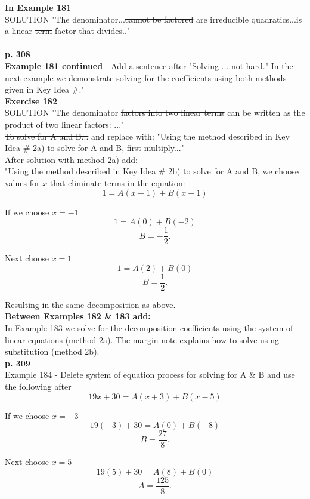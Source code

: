 \documentclass[11pt]{report}
\newlength\tindent
\renewcommand{\indent}{\hspace*{\tindent}}
\begin{document}
\textbf{In Example 181}\\
SOLUTION \indent "The denominator...\sout{cannot be factored} are irreducible quadratics...is a linear \sout{term} factor that divides.."\\ \\

\textbf{p. 308}\\

\textbf{Example 181 continued} - Add a sentence after "Solving ... not hard." In the next example we demonstrate solving for the coefficients using both methods given in Key Idea \#." \\

\textbf{Exercise 182}\\
SOLUTION \indent "The denominator \sout{factors into two linear terms} can be written as the product of two linear factors: ..."\\

\sout{To solve for A and B...} and replace with: "Using the method described in Key Idea \# 2a) to solve for A and B, first multiply..."\\

After solution with method 2a) add:\\
"Using the method described in Key Idea \# 2b) to solve for A and B, we choose values for $x$ that eliminate terms in the equation:
$$1=A(x+1) + B(x-1)$$

If we choose $x=-1$
$$1=A(0) + B(-2)$$
$$B= -\frac{1}{2}.$$ 

Next choose  $x=1$
$$1=A(2) + B(0)$$
$$B= \frac{1}{2}.$$ 

Resulting in the same decomposition as above.\\

\textbf{Between Examples 182 \& 183 add:}\\
In Example 183 we solve for the decomposition coefficients using the system of linear equations (method 2a). The margin note explains how to solve using substitution (method 2b).\\ 

\textbf{p. 309}\\
Example 184 - Delete system of equation process for solving for A \& B and use the following after 
$$19x+30=A(x+3) + B(x-5)$$

If we choose $x=-3$
$$19(-3)+30=A(0) + B(-8)$$
$$B= \frac{27}{8}.$$ 

Next choose  $x=5$
$$19(5)+30=A(8) + B(0)$$
$$A= \frac{125}{8}.$$ 
\\
\end{document}
